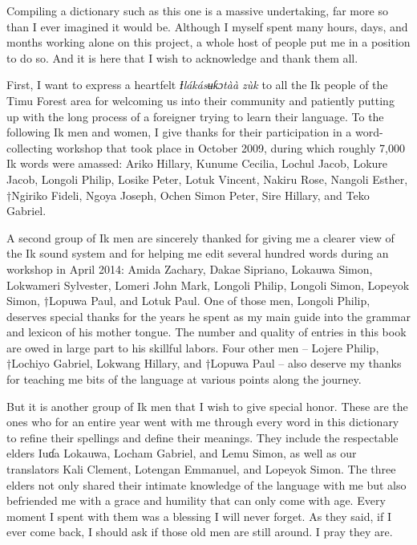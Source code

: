 
Compiling a dictionary such as this one is a massive undertaking, far more so than I ever imagined it would be. Although I myself spent many hours, days, and months working alone on this project, a whole host of people put me in a position to do so. And it is here that I wish to acknowledge and thank them all.

First, I want to express a heartfelt \textit{Ɨ}\textit{lákásʉƙɔt{\Í}àà zùk\ᵘ} to all the Ik people of the Timu Forest area for welcoming us into their community and patiently putting up with the long process of a foreigner trying to learn their language. To the following Ik men and women, I give thanks for their participation in a word-collecting workshop that took place in October 2009, during which roughly 7,000 Ik words were amassed: Ariko Hillary, Kunume Cecilia, Lochul Jacob, Lokure Jacob, Longoli Philip, Losike Peter, Lotuk Vincent, Nakiru Rose, Nangoli Esther, †Ngiriko Fideli, Ngoya Joseph, Ochen Simon Peter, Sire Hillary, and Teko Gabriel. 

A second group of Ik men are sincerely thanked for giving me a clearer view of the Ik sound system and for helping me edit several hundred words during an  workshop in April 2014: Amida Zachary, Dakae Sipriano, Lokauwa Simon, Lokwameri Sylvester, Lomeri John Mark, Longoli Philip, Longoli Simon, Lopeyok Simon, †Lopuwa Paul, and Lotuk Paul. One of those men, Longoli Philip, deserves special thanks for the years he spent as my main guide into the grammar and lexicon of his mother tongue. The number and quality of entries in this book are owed in large part to his skillful labors. Four other men – Lojere Philip, †Lochiyo Gabriel, Lokwang Hillary, and †Lopuwa Paul – also deserve my thanks for teaching me bits of the language at various points along the journey.

But it is another group of Ik men that I wish to give special honor. These are the ones who for an entire year went with me through every word in this dictionary to refine their spellings and define their meanings. They include the respectable elders Iuɗa Lokauwa, Locham Gabriel, and Lemu Simon, as well as our translators Kali Clement, Lotengan Emmanuel, and Lopeyok Simon. The three elders not only shared their intimate knowledge of the language with me but also befriended me with a grace and humility that can only come with age. Every moment I spent with them was a blessing I will never forget. As they said, if I ever come back, I should ask if those old men are still around. I pray they are.

